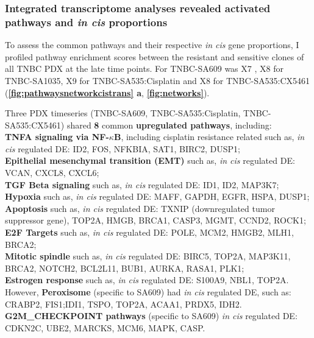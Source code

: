 \subsubsection{Integrated transcriptome analyses revealed  activated pathways and \textit{in cis} proportions}
To assess the common pathways and their respective  \textit{in cis} gene  proportions, I profiled pathway enrichment scores between the resistant and sensitive clones of all TNBC PDX at the late time points. For TNBC-SA609 was X7 , X8 for TNBC-SA1035, X9 for TNBC-SA535:Cisplatin and X8 for TNBC-SA535:CX5461 (\textbf{\autoref{fig:pathwaysnetworkcistrans} a}, \textbf{\autoref{fig:networks}}). 



Three PDX timeseries (TNBC-SA609, TNBC-SA535:Cisplatin, TNBC-SA535:CX5461) shared \textbf{8} common \textbf{upregulated pathways}, including:
\\
\textbf{TNFA signaling via NF-$\kappa$B}, including cisplatin resistance related such as, \textit{in cis} regulated DE:
ID2, FOS, NFKBIA, SAT1, BIRC2, DUSP1;
\\
\textbf{Epithelial mesenchymal transition (EMT)} such as, \textit{in cis} regulated DE: VCAN, CXCL8, CXCL6; 
\\
\textbf{TGF Beta signaling} such as, \textit{in cis} regulated DE: ID1, ID2, MAP3K7; 
\\
\textbf{Hypoxia} such as, \textit{in cis} regulated DE: MAFF, GAPDH, EGFR, HSPA, DUSP1;
\\
\textbf{Apoptosis} such as, \textit{in cis} regulated DE: TXNIP (downregulated tumor suppressor gene), TOP2A, HMGB, BRCA1, CASP3, MGMT, CCND2, ROCK1;
\\
 \textbf{E2F Targets} such as, \textit{in cis} regulated DE: POLE, MCM2, HMGB2, MLH1, BRCA2; 
 \\
 \textbf{Mitotic spindle} such as, \textit{in cis} regulated DE: BIRC5, TOP2A, MAP3K11, BRCA2, NOTCH2, BCL2L11, BUB1, AURKA, RASA1, PLK1;
 \\
 \textbf{Estrogen response} such as, \textit{in cis} regulated DE: S100A9, NBL1, TOP2A.
 \\ However, \textbf{Peroxisome} (specific to SA609) had \textit{in cis} regulated DE, such as: CRABP2, FIS1;IDI1, TSPO, TOP2A, ACAA1, PRDX5, IDH2. 
 \\\textbf{G2M\_CHECKPOINT pathways} (specific to SA609) \textit{in cis} regulated DE: CDKN2C, UBE2, MARCKS, MCM6, MAPK, CASP.
 
